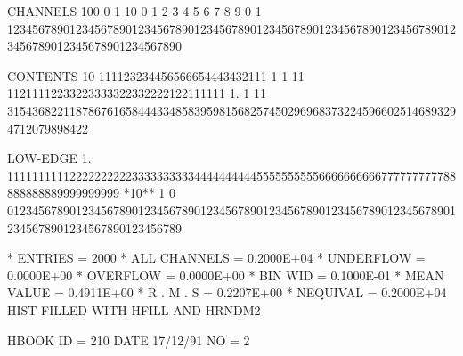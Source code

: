 \begin{Listing}
 CHANNELS 100   0                                                                                                  1   
           10   0        1         2         3         4         5         6         7         8         9         0   
            1   1234567890123456789012345678901234567890123456789012345678901234567890123456789012345678901234567890   
 
 CONTENTS  10                   111123234456566654443432111 1  1   11 11211112233223333322332222122111111           
            1.        1  11 3154368221187867616584443348583959815682574502969683732245966025146893294712079898422   
 
 LOW-EDGE   1.            111111111122222222223333333333444444444455555555556666666666777777777788888888889999999999
 *10**  1   0   0123456789012345678901234567890123456789012345678901234567890123456789012345678901234567890123456789
 
 * ENTRIES =       2000      * ALL CHANNELS = 0.2000E+04      * UNDERFLOW = 0.0000E+00      * OVERFLOW = 0.0000E+00
 * BIN WID = 0.1000E-01      * MEAN VALUE   = 0.4911E+00      * R . M . S = 0.2207E+00      * NEQUIVAL = 0.2000E+04
\finalnewpage
 HIST FILLED WITH HFILL AND HRNDM2                                               
 
 HBOOK     ID =       210                                        DATE  17/12/91              NO =   2
 

\end{Listing}
